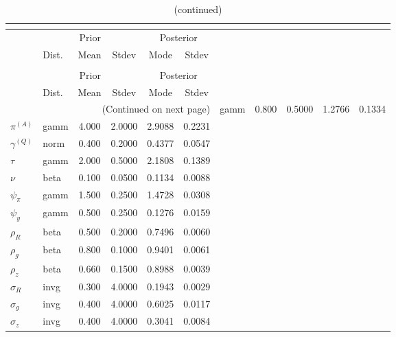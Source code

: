  
\begin{center}
\begin{longtable}{llcccc} 
\caption{Results from posterior maximization (parameters)}\\
 \label{Table:Posterior:1}\\
\toprule 
  & \multicolumn{3}{c}{Prior}  &  \multicolumn{2}{c}{Posterior} \\
  \cmidrule(r{.75em}){2-4} \cmidrule(r{.75em}){5-6}
  & Dist. & Mean  & Stdev & Mode & Stdev \\ 
\midrule \endfirsthead 
\caption{(continued)}\\
 \bottomrule 
  & \multicolumn{3}{c}{Prior}  &  \multicolumn{2}{c}{Posterior} \\
  \cmidrule(r{.75em}){2-4} \cmidrule(r{.75em}){5-6}
  & Dist. & Mean  & Stdev & Mode & Stdev \\ 
\midrule \endhead 
\bottomrule \multicolumn{6}{r}{(Continued on next page)}\endfoot 
\bottomrule\endlastfoot 
${r_{A}}$ & gamm &   0.800 & 0.5000 &   1.2766 &  0.1334 \\ 
${\pi^{(A)}}$ & gamm &   4.000 & 2.0000 &   2.9088 &  0.2231 \\ 
${\gamma^{(Q)}}$ & norm &   0.400 & 0.2000 &   0.4377 &  0.0547 \\ 
${\tau}$ & gamm &   2.000 & 0.5000 &   2.1808 &  0.1389 \\ 
${\nu}$ & beta &   0.100 & 0.0500 &   0.1134 &  0.0088 \\ 
${\psi_\pi}$ & gamm &   1.500 & 0.2500 &   1.4728 &  0.0308 \\ 
${\psi_y}$ & gamm &   0.500 & 0.2500 &   0.1276 &  0.0159 \\ 
${\rho_R}$ & beta &   0.500 & 0.2000 &   0.7496 &  0.0060 \\ 
${\rho_{g}}$ & beta &   0.800 & 0.1000 &   0.9401 &  0.0061 \\ 
${\rho_z}$ & beta &   0.660 & 0.1500 &   0.8988 &  0.0039 \\ 
${\sigma_R}$ & invg &   0.300 & 4.0000 &   0.1943 &  0.0029 \\ 
${\sigma_{g}}$ & invg &   0.400 & 4.0000 &   0.6025 &  0.0117 \\ 
${\sigma_z}$ & invg &   0.400 & 4.0000 &   0.3041 &  0.0084 \\ 
\end{longtable}
 \end{center}
